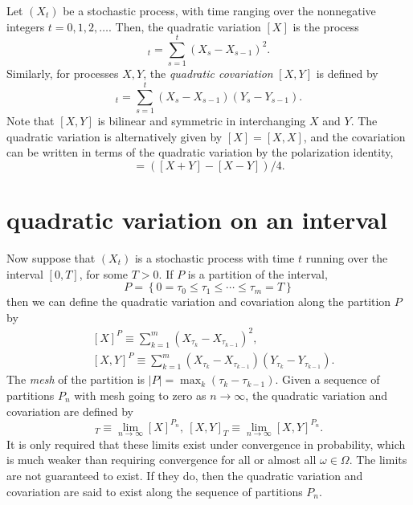 \documentclass[12pt]{article}
\begin{document}
Let $(X_t)$ be a stochastic process, with time ranging over the nonnegative integers $t=0,1,2,\ldots$. Then, the quadratic variation $[X]$ is the process
\begin{equation*}
[X]_t=\sum_{s=1}^t(X_{s}-X_{s-1})^2.
\end{equation*} 
Similarly, for processes $X,Y$, the \emph{quadratic covariation} $[X,Y]$ is defined by
\begin{equation*}
[X,Y]_t=\sum_{s=1}^t(X_{s}-X_{s-1})(Y_{s}-Y_{s-1}).
\end{equation*}
Note that $[X,Y]$ is bilinear and symmetric in interchanging $X$ and $Y$. The quadratic variation is alternatively given by $[X]=[X,X]$, and the covariation can be written in terms of the quadratic variation by the polarization identity,
\begin{equation*}
[X,Y]=([X+Y]-[X-Y])/4.
\end{equation*}

\section{quadratic variation on an interval}

Now suppose that $(X_t)$ is a stochastic process with time $t$ running over the interval $[0,T]$, for some $T>0$. If $P$ is a partition of the interval,
\begin{equation*}
P=\left\{0=\tau_0\le\tau_1\le\cdots\le\tau_m=T\right\}
\end{equation*}
then we can define the quadratic variation and covariation along the partition $P$ by
\begin{align*}
&[X]^P\equiv\sum_{k=1}^m(X_{\tau_k}-X_{\tau_{k-1}})^2,\\
&[X,Y]^P\equiv\sum_{k=1}^m(X_{\tau_k}-X_{\tau_{k-1}})(Y_{\tau_k}-Y_{\tau_{k-1}}).
\end{align*}
The \emph{mesh} of the partition is $|P|=\max_k(\tau_k-\tau_{k-1})$. Given a sequence of partitions $P_n$ with mesh going to zero as $n\rightarrow \infty$, the quadratic variation and covariation are defined by
\begin{equation*}
[X]_T\equiv\lim_{n\rightarrow\infty}[X]^{P_n},\ [X,Y]_T\equiv\lim_{n\rightarrow\infty}[X,Y]^{P_n}.
\end{equation*}
It is only required that these limits exist under convergence in probability, which is much weaker than requiring convergence for all or almost all $\omega\in\Omega$.
The limits are not guaranteed to exist. If they do, then the quadratic variation and covariation are said to exist along the sequence of partitions $P_n$.
\end{document}
